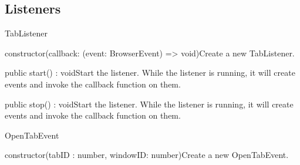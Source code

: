 \subsection{Listeners}
\begin{class}{TabListener}



\begin{constructors}
\begin{constructor}{constructor(callback: (event: BrowserEvent) => void)}{Create a new TabListener.}
\begin{parameters}
\end{parameters}
\end{constructor}
\end{constructors}
\begin{methods}
\begin{method}{public start() : void}{Start the listener. While the listener is running, it will create events and invoke the callback function on them.}
\end{method}
\begin{method}{public stop() : void}{Start the listener. While the listener is running, it will create events and invoke the callback function on them.}
\end{method}
\end{methods}
\end{class}

\begin{class}{OpenTabEvent}



\begin{constructors}
\begin{constructor}{constructor(tabID : number, windowID: number)}{Create a new OpenTabEvent.}
\begin{parameters}
\end{parameters}
\end{constructor}
\end{constructors}
\end{class}

